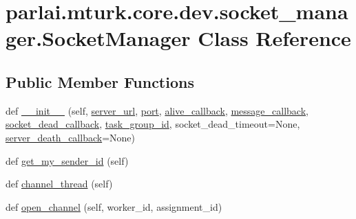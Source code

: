 \hypertarget{classparlai_1_1mturk_1_1core_1_1dev_1_1socket__manager_1_1SocketManager}{}\section{parlai.\+mturk.\+core.\+dev.\+socket\+\_\+manager.\+Socket\+Manager Class Reference}
\label{classparlai_1_1mturk_1_1core_1_1dev_1_1socket__manager_1_1SocketManager}
\subsection*{Public Member Functions}
\begin{DoxyCompactItemize}
\item 
def \hyperlink{classparlai_1_1mturk_1_1core_1_1dev_1_1socket__manager_1_1SocketManager_a972e94d9fa6b2a7fdc09184e06d343dd}{\+\_\+\+\_\+init\+\_\+\+\_\+} (self, \hyperlink{classparlai_1_1mturk_1_1core_1_1dev_1_1socket__manager_1_1SocketManager_acad729651125a67fe090b696336ca295}{server\+\_\+url}, \hyperlink{classparlai_1_1mturk_1_1core_1_1dev_1_1socket__manager_1_1SocketManager_a848a13d05acb749fcad5297b0d77c96d}{port}, \hyperlink{classparlai_1_1mturk_1_1core_1_1dev_1_1socket__manager_1_1SocketManager_ae0163694f6ce0aa9119d7d2018880bc1}{alive\+\_\+callback}, \hyperlink{classparlai_1_1mturk_1_1core_1_1dev_1_1socket__manager_1_1SocketManager_a16732b0839cf8965f9bc5fcadc024bd3}{message\+\_\+callback}, \hyperlink{classparlai_1_1mturk_1_1core_1_1dev_1_1socket__manager_1_1SocketManager_a46753b6b5339aa90f4ac61b758750ba2}{socket\+\_\+dead\+\_\+callback}, \hyperlink{classparlai_1_1mturk_1_1core_1_1dev_1_1socket__manager_1_1SocketManager_aefa0a43307df4b9f0b5c9e4077ae8322}{task\+\_\+group\+\_\+id}, socket\+\_\+dead\+\_\+timeout=None, \hyperlink{classparlai_1_1mturk_1_1core_1_1dev_1_1socket__manager_1_1SocketManager_a7f5438e52b97cd7e46b8470cf414c61e}{server\+\_\+death\+\_\+callback}=None)
\item 
def \hyperlink{classparlai_1_1mturk_1_1core_1_1dev_1_1socket__manager_1_1SocketManager_a5445dd4fe36e2aff2efb2d73c998abcb}{get\+\_\+my\+\_\+sender\+\_\+id} (self)
\item 
def \hyperlink{classparlai_1_1mturk_1_1core_1_1dev_1_1socket__manager_1_1SocketManager_a77dba972ee1a8e3dc165d2531864d974}{channel\+\_\+thread} (self)
\item 
def \hyperlink{classparlai_1_1mturk_1_1core_1_1dev_1_1socket__manager_1_1SocketManager_a9e2141e20af4e7d1f8a42837ed07f380}{open\+\_\+channel} (self, worker\+\_\+id, assignment\+\_\+id)

\end{DoxyCompactItemize}
